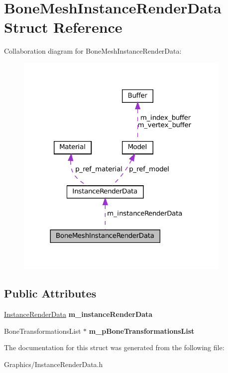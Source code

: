 \hypertarget{structBoneMeshInstanceRenderData}{}\section{Bone\+Mesh\+Instance\+Render\+Data Struct Reference}
\label{structBoneMeshInstanceRenderData}


Collaboration diagram for Bone\+Mesh\+Instance\+Render\+Data\+:
\nopagebreak
\begin{figure}[H]
\begin{center}
\leavevmode
\includegraphics[width=293pt]{structBoneMeshInstanceRenderData__coll__graph}
\end{center}
\end{figure}
\subsection*{Public Attributes}
\begin{DoxyCompactItemize}
\item 
\mbox{\label{structBoneMeshInstanceRenderData_aece2eb77387fb00b70aa51bd97fa5f6b}} 
\hyperlink{structInstanceRenderData}{Instance\+Render\+Data} {\bfseries m\+\_\+instance\+Render\+Data}
\item 
\mbox{\label{structBoneMeshInstanceRenderData_abf865b22020ad64a00f2fb32028c3262}} 
Bone\+Transformations\+List $\ast$ {\bfseries m\+\_\+p\+Bone\+Transformations\+List}
\end{DoxyCompactItemize}


The documentation for this struct was generated from the following file\+:\begin{DoxyCompactItemize}
\item 
Graphics/Instance\+Render\+Data.\+h\end{DoxyCompactItemize}
